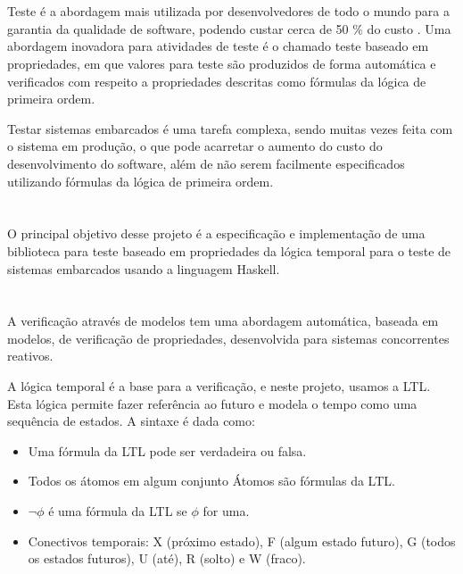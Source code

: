 \documentclass{sciposter}
\newcommand{\tituloA}[1]{\Large{\emph{\textbf{\color{white}{#1}}}}}
\begin{document}
  \begin{multicols}{3}{

  \setlength{\parindent}{2em}

  \section*{\tituloA{Introdução}}
    \Large Teste é a abordagem mais utilizada por desenvolvedores de todo o mundo para a garantia da qualidade de software, podendo custar cerca de 50 $\%$ do custo \cite{myers}. Uma abordagem inovadora para atividades de teste é o chamado teste baseado em propriedades, em que valores para teste são produzidos de forma automática e verificados com respeito a propriedades descritas como fórmulas da lógica de primeira ordem. 
    \par Testar sistemas embarcados é uma tarefa complexa, sendo muitas vezes feita com o sistema em produção, o que pode acarretar o aumento do custo do desenvolvimento do software, além de não serem facilmente especificados utilizando fórmulas da lógica de primeira ordem. 
    
\section*{\tituloA{Objetivos}}
O principal objetivo desse projeto é a especificação e implementação de uma biblioteca para teste baseado em propriedades da lógica temporal para o teste de sistemas embarcados usando a linguagem Haskell.

\section*{\tituloA{Sintaxe da Lógica Temporal}}
A verificação através de modelos tem uma abordagem automática, baseada em modelos, de verificação de propriedades, desenvolvida para sistemas concorrentes reativos.\cite{huth}
\par A lógica temporal é a base para a verificação, e neste projeto, usamos a LTL. Esta lógica permite fazer referência ao futuro e modela o tempo como uma sequência de estados. A sintaxe é dada como:
\begin{itemize}
	 \item Uma fórmula da LTL pode ser verdadeira ou falsa.
	 \item Todos os átomos em algum conjunto Átomos são fórmulas da LTL.
	 \item $\neg \phi$ é uma fórmula da LTL se $\phi$ for uma.
	 \item Conectivos temporais: X (próximo estado), F (algum estado futuro), G (todos os estados futuros), U (até), R (solto) e W (fraco).
\end{itemize}

}
\end{multicols}
\end{document}
